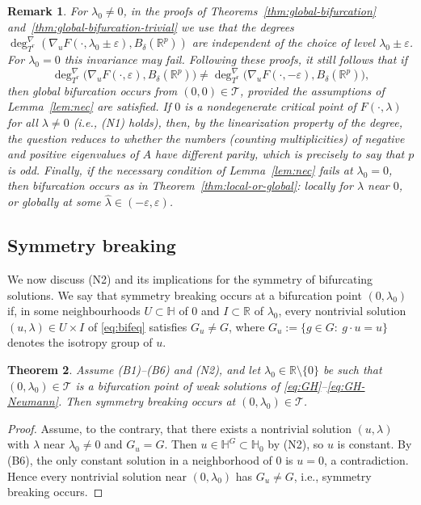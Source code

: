 \documentclass[reqno,twoside,12pt]{amsart}
\newtheorem{Remark}{Remark}[section]
\newtheorem{Theorem}[Remark]{Theorem}
\newcommand{\bH}{\mathbb{H}}
\newcommand{\bR}{\mathbb{R}}
\newcommand{\cT}{\mathcal{T}}
\numberwithin{equation}{section} \errorcontextlines=0
\begin{document}
\begin{Remark}
For $\lambda_{0}\neq 0$, in the proofs of Theorems~\ref{thm:global-bifurcation} and~\ref{thm:global-bifurcation-trivial} we use that the degrees
$
\deg^{\nabla}_{T^{r}}(\nabla_{u}F(\cdot,\lambda_{0}\pm\varepsilon), B_{\delta}(\mathbb{R}^{p}))
$
are independent of the choice of level $\lambda_{0}\pm\varepsilon$. For $\lambda_{0}=0$ this invariance may fail. Following these proofs, it still follows that if
\[
\deg^{\nabla}_{T^{r}}\bigl(\nabla_{u}F(\cdot,\varepsilon), B_{\delta}(\mathbb{R}^{p})\bigr)
\neq
\deg^{\nabla}_{T^{r}}\bigl(\nabla_{u}F(\cdot,-\varepsilon), B_{\delta}(\mathbb{R}^{p})\bigr),
\]
then global bifurcation occurs from $(0,0)\in\cT$, provided the assumptions of Lemma~\ref{lem:nec} are satisfied.
If $0$ is a nondegenerate critical point of $F(\cdot,\lambda)$ for all $\lambda\neq 0$ (i.e., \textnormal{(N1)} holds), then, by the linearization property of the degree, the question reduces to whether the numbers (counting multiplicities) of negative and positive eigenvalues of $A$ have different parity, which is precisely to say that $p$ is odd.
Finally, if the necessary condition of Lemma~\ref{lem:nec} fails at $\lambda_0=0$, then bifurcation occurs as in Theorem~\ref{thm:local-or-global}: locally for $\lambda$ near $0$, or globally at some $\widehat\lambda\in(-\varepsilon,\varepsilon)$.
\end{Remark}

\subsection{Symmetry breaking}\label{subsec:symmetry-breaking}
We now discuss \textnormal{(N2)} and its implications for the symmetry of bifurcating solutions. We say that symmetry breaking occurs at a bifurcation point $(0,\lambda_{0})$ if, in some neighbourhoods $U\subset\bH$ of $0$ and $I\subset\bR$ of $\lambda_{0}$, every nontrivial solution $(u,\lambda)\in U\times I$ of \eqref{eq:bifeq} satisfies $G_{u}\neq G$, where $G_{u}:=\{g\in G:\ g\cdot u=u\}$ denotes the isotropy group of $u$.

\begin{Theorem}\label{thm:symm-selection}
Assume \textnormal{(B1)}--\textnormal{(B6)} and \textnormal{(N2)}, and let $\lambda_{0}\in\bR\setminus\{0\}$ be such that $(0,\lambda_{0})\in\cT$ is a bifurcation point of weak solutions of \eqref{eq:GH}--\eqref{eq:GH-Neumann}. Then symmetry breaking occurs at $(0,\lambda_{0})\in\cT$.
\end{Theorem}
\begin{proof}
Assume, to the contrary, that there exists a nontrivial solution $(u,\lambda)$ with $\lambda$ near $\lambda_{0}\ne 0$ and $G_{u}=G$. Then $u\in\bH^{G}\subset\bH_{0}$ by \textnormal{(N2)}, so $u$ is constant. By \textnormal{(B6)}, the only constant solution in a neighborhood of $0$ is $u=0$, a contradiction. Hence every nontrivial solution near $(0,\lambda_{0})$ has $G_{u}\ne G$, i.e., symmetry breaking occurs.
\end{proof}
\end{document}
